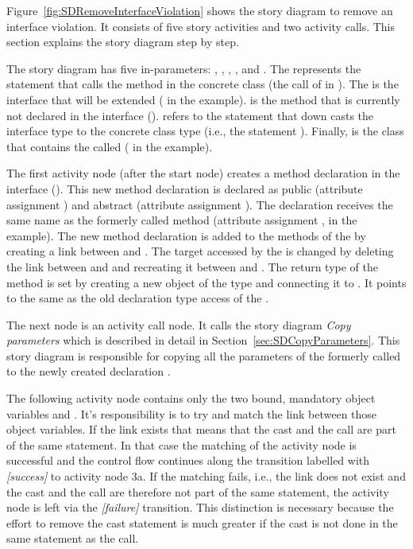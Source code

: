 Figure~\ref{fig:SDRemoveInterfaceViolation} shows the story diagram to remove an interface violation. It consists of five story activities and two activity calls. This section explains the story diagram step by step.

The story diagram has five in-parameters: , , , , and . The  represents the statement that calls the method in the concrete class (the call of  in ). The  is the interface that will be extended ( in the example).  is the method that is currently not declared in the interface ().  refers to the statement that down casts the interface type to the concrete class type (i.e., the statement ). Finally,  is the class that contains the called  ( in the example).

The first activity node (after the start node) creates a method declaration in the interface (). This new method declaration is declared as public (attribute assignment ) and abstract (attribute assignment ). The declaration receives the same name as the formerly called method (attribute assignment ,  in the example). The new method declaration is added to the methods of the  by creating a  link between  and . The target accessed by the  is changed by deleting the link between  and  and recreating it between  and . The return type of the method is set by creating a new object  of the type  and connecting it to . It points to the same  as the old declaration type access of the .

The next node is an activity call node. It calls the story diagram \emph{Copy parameters} which is described in detail in Section~\ref{sec:SDCopyParameters}. This story diagram is responsible for copying all the parameters of the formerly called  to the newly created declaration .

The following activity node contains only the two bound, mandatory object variables  and . It's responsibility is to try and match the link  between those object variables. If the link exists that means that the cast and the call are part of the same statement. In that case the matching of the activity node is successful and the control flow continues along the transition labelled with \emph{[success]} to activity node 3a. If the matching fails, i.e., the link does not exist and the cast and the call are therefore not part of the same statement, the activity node is left via the \emph{[failure]} transition. This distinction is necessary because the effort to remove the cast statement is much greater if the cast is not done in the same statement as the call.

